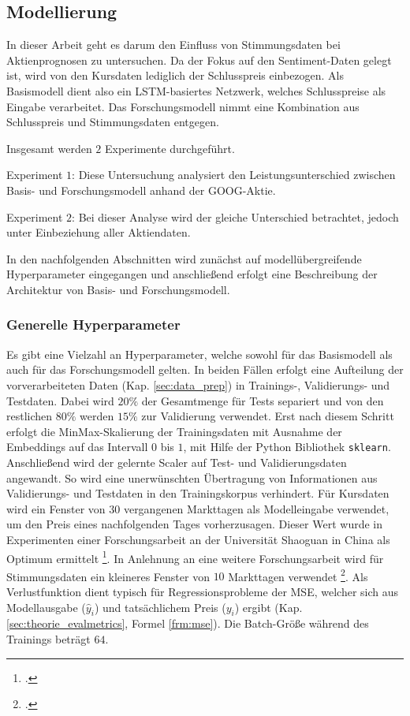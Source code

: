 \newpage
\subsection{Modellierung}\label{sec:modellierung}

In dieser Arbeit geht es darum den Einfluss von Stimmungsdaten bei Aktienprognosen zu untersuchen. Da der Fokus auf den Sentiment-Daten gelegt ist, wird von den Kursdaten lediglich der Schlusspreis einbezogen. Als Basismodell dient also ein LSTM-basiertes Netzwerk, welches Schlusspreise als Eingabe verarbeitet. Das Forschungsmodell nimmt eine Kombination aus Schlusspreis und Stimmungsdaten entgegen.

Insgesamt werden $2$ Experimente durchgeführt. 

Experiment $1$:    
Diese Untersuchung analysiert den Leistungsunterschied zwischen Basis- und Forschungsmodell anhand der GOOG-Aktie.

Experiment $2$:   
Bei dieser Analyse wird der gleiche Unterschied betrachtet, jedoch unter Einbeziehung aller Aktiendaten.

In den nachfolgenden Abschnitten wird zunächst auf modellübergreifende Hyperparameter eingegangen und anschließend erfolgt eine Beschreibung der Architektur von Basis- und Forschungsmodell.

\subsubsection*{Generelle Hyperparameter}\label{sec:modellierung_generell_hp}

Es gibt eine Vielzahl an Hyperparameter, welche sowohl für das Basismodell als auch für das Forschungsmodell gelten. 
In beiden Fällen erfolgt eine Aufteilung der vorverarbeiteten Daten (Kap. \ref{sec:data_prep}) in Trainings-, Validierungs- und Testdaten. Dabei wird $20\%$ der Gesamtmenge für Tests separiert und von den restlichen $80\%$ werden $15\%$ zur Validierung verwendet.
Erst nach diesem Schritt erfolgt die MinMax-Skalierung der Trainingsdaten mit Ausnahme der Embeddings auf das Intervall $0$ bis $1$, mit Hilfe der Python Bibliothek \texttt{sklearn}. Anschließend wird der gelernte Scaler auf Test- und Validierungsdaten angewandt. So wird eine unerwünschten Übertragung von Informationen aus Validierungs- und Testdaten in den Trainingskorpus verhindert. 
Für Kursdaten wird ein Fenster von $30$ vergangenen Markttagen als Modelleingabe verwendet, um den Preis eines nachfolgenden Tages vorherzusagen. Dieser Wert wurde in Experimenten einer Forschungsarbeit an der Universität Shaoguan in China als Optimum ermittelt \footcite[Tabelle 3]{xie2024deep}.
In Anlehnung an eine weitere Forschungsarbeit wird für Stimmungsdaten ein kleineres Fenster von $10$ Markttagen verwendet \footcite[Kap. 4.1]{zhang2022transformer}.
Als Verlustfunktion dient typisch für Regressionsprobleme der \ac{MSE}, welcher sich aus Modellausgabe ($\hat{y}_i$) und tatsächlichem Preis ($y_i$) ergibt (Kap. \ref{sec:theorie_evalmetrics}, Formel \ref{frm:mse}). 
Die Batch-Größe während des Trainings beträgt $64$.



